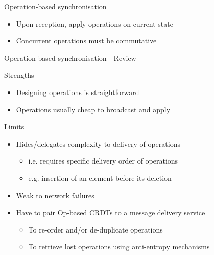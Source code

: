 \begin{frame}{Operation-based synchronisation}
\begin{figure}[!ht]
{
        }
    \end{figure}

    \pause

    \begin{itemize}
        \item<2-> Upon reception, \alert{apply operations on current state}
        \item<4-> \alert{Concurrent operations} must be \alert{commutative}
    \end{itemize}
\end{frame}

\begin{frame}{Operation-based synchronisation - Review}

    \begin{block}{Strengths}
        \begin{itemize}
            \item Designing operations is straightforward
            \item Operations usually cheap to broadcast and apply
        \end{itemize}
    \end{block}

    \pause

    \begin{block}{Limits}
        \begin{itemize}
            \item Hides/delegates complexity to delivery of operations
            \begin{itemize}
                \item i.e. requires specific delivery order of operations
                \item e.g. insertion of an element before its deletion
            \end{itemize}
            \pause
            \item Weak to network failures
            \pause
            \item Have to pair Op-based CRDTs to a message delivery service
            \begin{itemize}
                \item To re-order and/or de-duplicate operations
                \item To retrieve lost operations using anti-entropy mechanisms
            \end{itemize}
        \end{itemize}
    \end{block}
\end{frame}